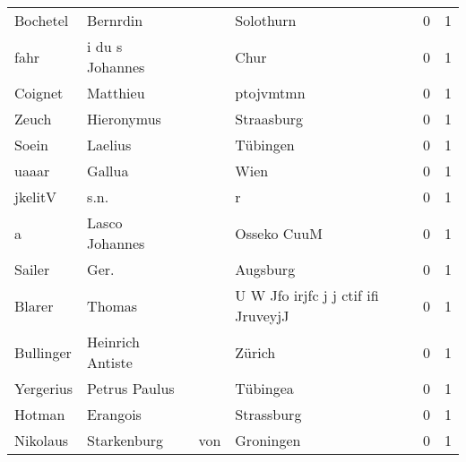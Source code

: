 \begin{tabular}{llllrr}
                 Bochetel &                           Bernrdin &             &                                   Solothurn &          0 &         1 \\
                     fahr &                    i du s Johannes &             &                                        Chur &          0 &         1 \\
                  Coignet &                           Matthieu &             &                                   ptojvmtmn &          0 &         1 \\
                    Zeuch &                         Hieronymus &             &                                  Straasburg &          0 &         1 \\
                    Soein &                            Laelius &             &                                    Tübingen &          0 &         1 \\
                    uaaar &                             Gallua &             &                                        Wien &          0 &         1 \\
                  jkelitV &                               s.n. &             &                                           r &          0 &         1 \\
                        a &                     Lasco Johannes &             &                                 Osseko CuuM &          0 &         1 \\
                   Sailer &                               Ger. &             &                                    Augsburg &          0 &         1 \\
                   Blarer &                             Thomas &             &         U W Jfo irjfc j j ctif ifi JruveyjJ &          0 &         1 \\
                Bullinger &                   Heinrich Antiste &             &                                      Zürich &          0 &         1 \\
                Yergerius &                      Petrus Paulus &             &                                    Tübingea &          0 &         1 \\
                   Hotman &                           Erangois &             &                                  Strassburg &          0 &         1 \\
                 Nikolaus &                        Starkenburg &         von &                                   Groningen &          0 &         1 \\

\end{tabular}
